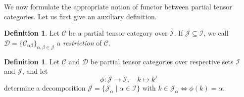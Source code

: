 \documentclass[10pt]{article}
\newcommand{\CatC}{\mathcal{C}}
\newcommand{\CatCC}{\mathscr{C}}
\newcommand{\CatDD}{\mathscr{D}}
\theoremstyle{definition}
\newtheorem{Def}[Theorem]{Definition}
\numberwithin{equation}{section}
\begin{document}
We now formulate the appropriate notion of functor between partial tensor categories. Let us first give an auxiliary definition.

\begin{Def} Let $\CatCC$ be a partial tensor category over $\mathscr{I}$. If $\mathscr{J}\subseteq \mathscr{I}$, we call $\CatDD = \{\CatC_{\alpha\beta}\}_{\alpha,\beta\in \mathscr{J}}$ a \emph{restriction} of $\CatCC$. 
\end{Def} 

\begin{Def} Let $\CatCC$ and $\CatDD$ be partial tensor categories over respective sets $\mathscr{I}$ and $\mathscr{J}$, and let \[\phi:\mathscr{J}\rightarrow \mathscr{I},\quad k \mapsto k'\] determine a decomposition $\mathscr{J} = \{\mathscr{J}_\alpha\mid \alpha\in \mathscr{I}\}$ with $k\in \mathscr{J}_\alpha \iff \phi(k)=\alpha$. 


\end{Def}
\end{document}
